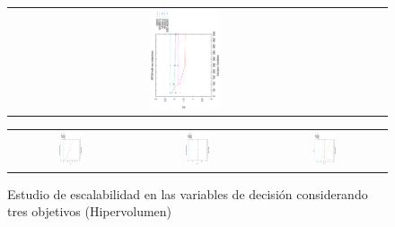 \begin{figure}[H]
\begin{tabular}{ccc}
    \includegraphics[width=0.2\textwidth, angle=-90,origin=c]{Figures_Chapter7/Results_Chapter3/WFG8_2obj_Scalability.eps}  

\end{tabular}
\end{figure}

\begin{figure}[H]
\centering
\caption{Estudio de escalabilidad en las variables de decisión considerando tres objetivos (Hipervolumen)}
\label{fig:Scalability_Study_HV_2_exp}
\begin{tabular}{ccc}
   \includegraphics[width=0.2\textwidth, angle=-90,origin=c]{Figures_Chapter7/Results_Chapter3/DTLZ4_3obj_Scalability.eps} &
    \includegraphics[width=0.2\textwidth, angle=-90,origin=c]{Figures_Chapter7/Results_Chapter3/DTLZ7_3obj_Scalability.eps} &
    \includegraphics[width=0.2\textwidth,  angle=-90,origin=c]{Figures_Chapter7/Results_Chapter3/UF10_Scalability.eps}  
    \\

\end{tabular}
\end{figure}
